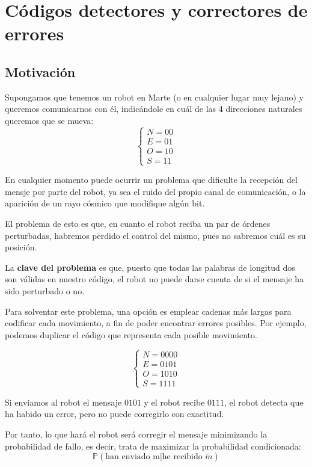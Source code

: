 \chapter{Códigos detectores y correctores de errores}
\section{Motivación}
\begin{example}
Supongamos que tenemos un robot en Marte (o en cualquier lugar muy lejano) y queremos comunicarnos con él, indicándole en cuál de las 4 direcciones naturales queremos que se mueva:
\[\left\{ \begin{array}{l}
N = 00 \\ E = 01 \\ O = 10 \\ S = 11
\end{array}\right.\]

En cualquier momento puede ocurrir un problema que dificulte la recepción del mensje por parte del robot, ya sea el ruido del propio canal de comunicación, o la aparición de un rayo cósmico que modifique algún bit.

El problema de esto es que, en cuanto el robot reciba un par de órdenes perturbadas, habremos perdido el control del mismo, pues no sabremos cuál es su posición.

La \textbf{clave del problema} es que, puesto que todas las palabras de longitud dos son válidas en nuestro código, el robot no puede darse cuenta de si el mensaje ha sido perturbado o no.

Para solventar este problema, una opción es emplear cadenas más largas para codificar cada movimiento, a fin de poder encontrar errores posibles. Por ejemplo, podemos duplicar el código que representa cada posible movimiento.

\[\left\{ \begin{array}{l}
N = 0000 \\ E = 0101 \\ O = 1010 \\ S = 1111
\end{array}\right.\]

Si enviamos al robot el mensaje $0101$ y el robot recibe $0111$, el robot detecta que ha habido un error, pero no puede corregirlo con exactitud.

Por tanto, lo que hará el robot será corregir el mensaje minimizando la probabilidad de fallo, es decir, trata de maximizar la probabilidad condicionada:
\[\mathbb{P} \left(\text{han enviado m} | \text{he recibido }\tilde{m} \right)\]


\end{example}
